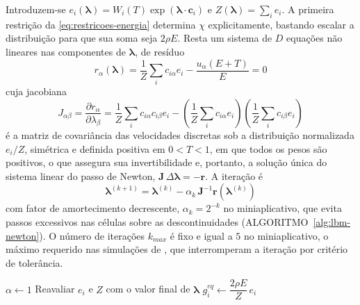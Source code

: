 Introduzem-se $e_i(\boldsymbol{\lambda}) = W_i(T) \exp(\boldsymbol{\lambda} \cdot \mathbf{c}_i)$ e $Z(\boldsymbol{\lambda}) = \sum_i e_i$.
A primeira restrição da \eqref{eq:restricoes-energia} determina $\chi$ explicitamente, bastando escalar a distribuição para que sua soma seja $2\rho E$.
Resta um sistema de $D$ equações não lineares nas componentes de $\boldsymbol{\lambda}$, de resíduo
\begin{equation}\label{eq:residuo-newton}
    r_\alpha(\boldsymbol{\lambda}) = \frac{1}{Z} \sum_i c_{i\alpha} e_i - \frac{u_\alpha (E + T)}{E} = 0
\end{equation}
cuja jacobiana
\begin{equation}\label{eq:jacobiana-newton}
    J_{\alpha\beta} = \frac{\partial r_\alpha}{\partial \lambda_\beta} = \frac{1}{Z} \sum_i c_{i\alpha} c_{i\beta} e_i - \left( \frac{1}{Z} \sum_i c_{i\alpha} e_i \right) \left( \frac{1}{Z} \sum_i c_{i\beta} e_i \right)
\end{equation}
é a matriz de covariância das velocidades discretas sob a distribuição normalizada $e_i / Z$, simétrica e definida positiva em $0 < T < 1$, em que todos os pesos são positivos, o que assegura sua invertibilidade e, portanto, a solução única do sistema linear do passo de Newton, $\mathbf{J}\,\Delta\boldsymbol{\lambda} = -\mathbf{r}$.
A iteração é
\begin{equation}\label{eq:atualizacao-newton}
    \boldsymbol{\lambda}^{(k+1)} = \boldsymbol{\lambda}^{(k)} - \alpha_k\, \mathbf{J}^{-1} \mathbf{r}\!\left( \boldsymbol{\lambda}^{(k)} \right)
\end{equation}
com fator de amortecimento decrescente, $\alpha_k = 2^{-k}$ no miniaplicativo, que evita passos excessivos nas células sobre as descontinuidades (ALGORITMO~\ref{alg:lbm-newton}).
O número de iterações $k_{max}$ é fixo e igual a $5$ no miniaplicativo, o máximo requerido nas simulações de \textcite{Rathnayake2024}, que interromperam a iteração por critério de tolerância.

\begin{algorithm}[H]
\caption{Determinação dos multiplicadores de Lagrange do equilíbrio térmico}\label{alg:lbm-newton}
$\alpha \gets 1$\;
Reavaliar $e_i$ e $Z$ com o valor final de $\boldsymbol{\lambda}$\;
$g_i^{eq} \gets \dfrac{2 \rho E}{Z}\, e_i$\;
\end{algorithm}

